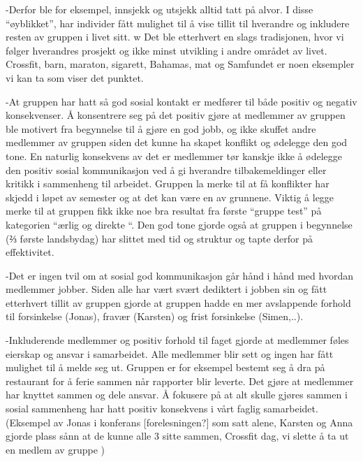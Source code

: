 -Derfor ble for eksempel, innsjekk og utsjekk alltid tatt på alvor. I disse “øyblikket”, har individer fått mulighet til å vise tillit til hverandre og inkludere resten av gruppen i livet sitt. w
Det ble etterhvert en slags tradisjonen, hvor vi følger hverandres prosjekt og ikke minst utvikling i andre området av livet. Crossfit, barn, maraton, sigarett, Bahamas, mat og Samfundet er noen eksempler vi kan ta som viser det punktet. 

-At gruppen har hatt så god sosial kontakt er medfører til både positiv og negativ konsekvenser. Å konsentrere seg på det positiv gjøre at medlemmer av gruppen ble motivert fra begynnelse til å gjøre en god jobb, og ikke skuffet andre medlemmer av gruppen siden det kunne ha skapet konflikt og ødelegge den god tone. En naturlig konsekvens av det er medlemmer tør kanskje ikke å ødelegge den positiv sosial kommunikasjon ved å gi hverandre tilbakemeldinger eller kritikk i sammenheng til arbeidet. Gruppen la merke til at få konflikter har skjedd i løpet av semester og at det kan være en av grunnene. Viktig å legge merke til at gruppen fikk ikke noe bra resultat fra første “gruppe test” på kategorien “ærlig og direkte “. Den god tone gjorde også at gruppen i begynnelse (⅔ første landsbydag)  har slittet med tid og struktur og tapte derfor på effektivitet. 

-Det er ingen tvil om at sosial god kommunikasjon går hånd i hånd med hvordan medlemmer jobber. Siden alle har vært svært dediktert i jobben sin og fått etterhvert tillit av gruppen gjorde at gruppen hadde en mer avslappende forhold til forsinkelse (Jonas), fravær (Karsten) og frist forsinkelse (Simen,..). 

-Inkluderende medlemmer og positiv forhold til faget gjorde at medlemmer føles eierskap og ansvar i samarbeidet. Alle medlemmer blir sett og ingen har fått mulighet til å melde seg ut. Gruppen er for eksempel  bestemt seg å  dra på restaurant for å ferie sammen når rapporter blir leverte. Det gjøre at medlemmer har knyttet sammen og dele ansvar.  Å fokusere på at alt skulle gjøres sammen i sosial sammenheng har hatt positiv konsekvens i vårt faglig samarbeidet. (Eksempel av Jonas i konferans [forelesningen?] som satt alene, Karsten og Anna gjorde plass sånn at de kunne alle 3 sitte sammen, Crossfit dag, vi slette å ta ut en medlem av gruppe )









